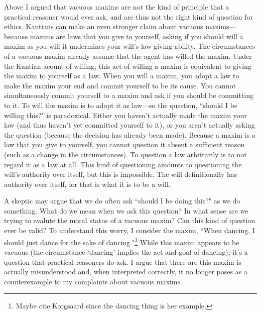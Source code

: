 \begin{isabellebody}
\begin{isamarkuptext}
Above I argued that vacuous maxims are not the kind of principle that a practical reasoner would ever
ask, and are thus not the right kind of question for ethics. Kantians can make an even stronger claim
about vacuous maxims—because maxims are laws that you give to yourself, asking if you should will 
a maxim as you will it undermines your will's law-giving ability. The circumstances of a vacuous maxim 
already assume that the agent has willed the maxim. Under the Kantian acount of willing, this act 
of willing a maxim is equivalent to giving the maxim to yourself as a law. When you will a maxim, you
adopt a law to make the maxim your end and commit yourself to be its cause. You cannot simultaneously 
commit yourself to a maxim and ask if you should be committing to it. To 
will the maxim is to adopt it as law—so the question, ``should I be 
willing this?" is paradoxical. Either you haven't actually made the maxim your law (and thus haven't yet 
committed yourself to it), or you aren't actually asking the question (because the decision has already been made).
Because a maxim is a law that you give to yourself, you cannot question it absent a sufficient reason 
(such as a change in the circumstances). To question a law arbitrarily is to not regard it as a law at all.
This kind of questioning amounts to questioning the will's authority over itself, but this is 
impossible. The will definitionally has authority over itself, for that is what it is to be a 
will. 

A skeptic may argue that we do often ask ``should I be doing this?" as we do something. What do we mean when 
we ask this question? In what sense are we trying to evalute the moral status of a vacuous maxim?
Can this kind of question ever be valid? To understand this worry, I consider the maxim, 
``When dancing, I should just dance for the sake of dancing."\footnote{Maybe cite Korgsaard since the
dancing thing is her example.} While this maxim appears to be vacuous (the 
circumstance `dancing' implies the act and goal of dancing), it's a question that practical reasoners 
do ask. I argue that there are this maxim is actually misunderstood and, when interpreted correctly,
it no longer poses as a counterexample to my complaints about vacuous maxims.


\end{isamarkuptext}
\end{isabellebody}

